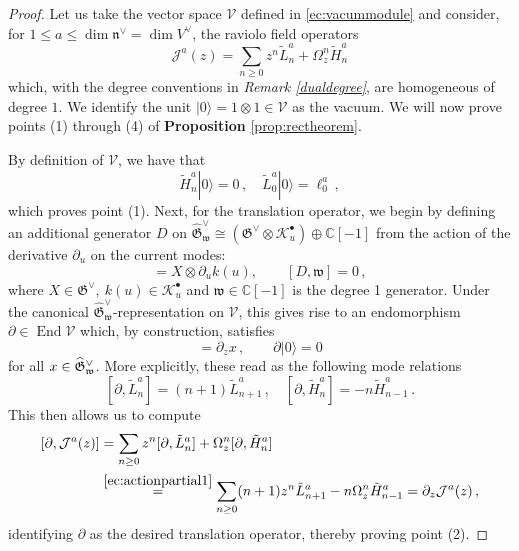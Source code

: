 \documentclass[11pt]{amsart}
\newcommand{\C}{{\mathbb C}}
\newcommand{\tL}{{\tilde L}}
\newcommand{\tH}{{\tilde H}}
\newcommand{\fG}{\mathfrak{G}}
\numberwithin{equation}{section}
\numberwithin{figure}{section}
\numberwithin{table}{section}
\theoremstyle{thm}
\numberwithin{equation}{subsection}
\theoremstyle{definition}
\theoremstyle{rem}
\begin{document}
\begin{proof}
Let us take the vector space $\mathcal{V}$ defined in \eqref{ec:vacummodule} and consider, for $1\leq a\leq \operatorname{dim}\mathfrak{n}^\vee=\operatorname{dim}V^\vee$, the raviolo field operators
\begin{equation}
    \mathcal{J}^a(z) = \sum_{n\geq 0} z^n \tL_n^a  + \Omega_z^n \tH^a_n
\end{equation}
which, with the degree conventions in \textit{Remark \ref{dualdegree}}, are homogeneous of degree $1$. We identify the unit $ |0\rangle=1\otimes 1\in\mathcal{V}$ as the vacuum. We will now prove points (1) through (4) of \textbf{Proposition} \ref{prop:rectheorem}. 



By definition of $\mathcal{V}$, we have that
\begin{equation}
    \tH_n^a |0\rangle=0 \,,\quad  \tL_0^a|0\rangle = \ell_0^a\,,\label{vacmodulepolynomials}
\end{equation}
which proves point (1). Next, for the translation operator, we 
begin by defining an additional generator $D$ on $\widehat{\fG}^\vee_\mathfrak{w}\cong (\fG^\vee\otimes\mathcal{K}^\bullet_u)\oplus \C[-1]$ from the action of the derivative $\partial_u$ on the current modes:
\begin{equation*}
    [D,X\otimes k(u)] = X\otimes\partial_u k(u), \qquad [D,\mathfrak{w}]=0\,,
\end{equation*}
where $X\in\fG^\vee,~ k(u)\in\mathcal{K}_u^\bullet$ and $\mathfrak{w}\in\C[-1]$ is the degree 1 generator.  Under the canonical $\widehat{\fG}^\vee_\mathfrak{w}$-representation  on $\mathcal{V}$, this gives rise to an endomorphism $\partial\in\operatorname{End}\mathcal{V}$ which, by construction, satisfies
\begin{equation}
    [\partial,x]=\partial_z x\,,\qquad \partial|0\rangle = 0\label{translate}
\end{equation}
for all $x\in \widehat{\fG}^\vee_\frak{w}$. More explicitly,  these read as the following mode relations
\begin{equation}
\label{ec:actionpartial1}
    [\partial ,\tL_n^a] = (n+1)\tL_{n+1}^a\,,\quad [\partial, \tH_n^a] = -n \tH_{n-1}^a\,.
\end{equation}
This then allows us to compute
\begin{equation}
\label{ec:actionpartial2}
\begin{split}
    [\partial,\mathcal{J}^a(z)]
    &=\sum_{n\geq 0}z^n[\partial,\tL_n^a]+ \Omega_z^n[\partial,\tH_n^a] \\
&\stackrel{\eqref{ec:actionpartial1}}{=} \sum_{n\geq 0 }(n+1)z^n \tL_{n+1}^a - n\Omega^{n}_z\tH_{n-1}^a=\partial_z \mathcal{J}^a(z)\,,
\end{split} 
\end{equation}
identifying $\partial$ as the desired translation operator, thereby proving point (2). 


\end{proof}
\end{document}
